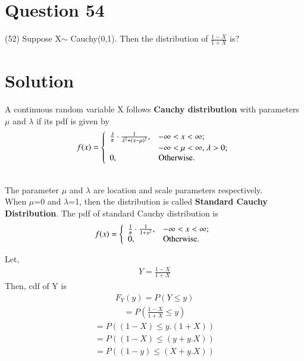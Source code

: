 \documentclass[journal,12pt,twocolumn]{IEEEtran}
\begin{document}
\section{Question 54}
(52) Suppose X$\sim$ Cauchy(0,1). Then the distribution of
$\frac{1-X}{1+X}$ is?
\section{Solution}
A continuous random variable X follows \textbf{Cauchy distribution} with parameters $\mu$ and $\lambda$ if its pdf is given by
\\
    \begin{equation*} f(x) =\left\{ \begin{array}{ll} \frac{\lambda}{\pi}\cdot \frac{1}{\lambda^2+(x-\mu)^2}, & \hbox{$-\infty < x< \infty$;} \\ & \hbox{$-\infty < \mu< \infty$, $\lambda>0$;} \\ 0, & \hbox{Otherwise.} \end{array} \right. \end{equation*}
    
\\
The parameter $\mu$ and $\lambda$ are location and scale parameters respectively. 
\\
When $\mu$=0 and $\lambda$=1, then the distribution is called \textbf{Standard Cauchy Distribution}. The pdf of standard Cauchy distribution is
\\
\begin{equation*} f(x) =\left\{ \begin{array}{ll} \frac{1}{\pi}\cdot \frac{1}{1+x^2}, & \hbox{$-\infty < x< \infty$;} \\ 0, & \hbox{Otherwise.} \end{array} \right. \end{equation*}

Let,
\begin{align}
    Y = \frac{1-X}{1+X}
\end{align}
Then, cdf of Y is
\begin{align}
    F_{Y}(y) = P(Y \leq y)
\end{align}
\begin{align}
    = P\left(\frac{1-X}{1+X} \leq y\right)
\end{align}
\begin{align}
    = P\left((1-X) \leq y.(1+X)\right)
\end{align}
\begin{align}
    = P\left((1-X) \leq (y+y.X)\right)
\end{align}
\begin{align}
    = P\left((1-y) \leq (X+y.X)\right)
\end{align}
\end{document}

